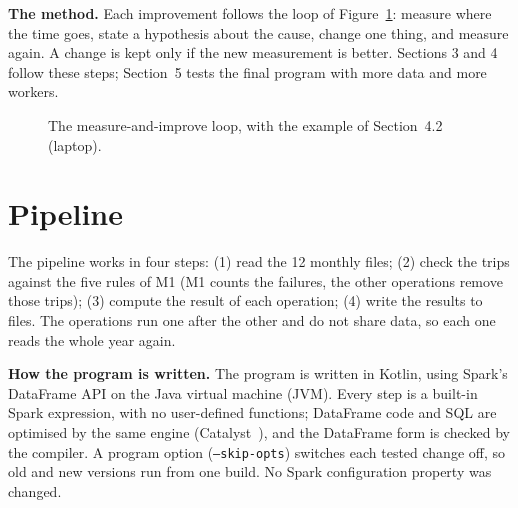 \documentclass[sigconf]{acmart}
\newcommand{\mib}{\,MiB}
\newcommand{\s}{\,s}
\begin{document}
\textbf{The method.} Each improvement follows the loop of Figure~\ref{fig:loop}: measure where
the time goes, state a hypothesis about the cause, change one thing, and measure again. A change
is kept only if the new measurement is better. Sections 3 and 4 follow these steps; Section~5
tests the final program with more data and more workers.

\begin{figure}[h]
\centering
{}
\caption{The measure-and-improve loop, with the example of Section~4.2 (laptop).}
\label{fig:loop}
\end{figure}

\section{Pipeline}

The pipeline works in four steps: (1) read the 12 monthly files; (2) check the trips against
the five rules of M1 (M1 counts the failures, the other operations remove those trips);
(3) compute the result of each operation; (4) write the results to files. The operations run
one after the other and do not share data, so each one reads the whole year again.

\textbf{How the program is written.} The program is written in Kotlin, using Spark's DataFrame
API on the Java virtual machine (JVM). Every step is a built-in Spark expression, with no
user-defined functions; DataFrame code and SQL are optimised by the same engine
(Catalyst~\cite{armbrust2015}), and the DataFrame form is checked by the compiler. A program
option (\texttt{--skip-opts}) switches each tested change off, so old and new versions run from
one build. No Spark configuration property was changed.
\end{document}
